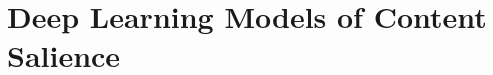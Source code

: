 
\section{Deep Learning Models of Content Salience}
\label{sec:chapter4}
\label{sec:deep_learning_salience}






